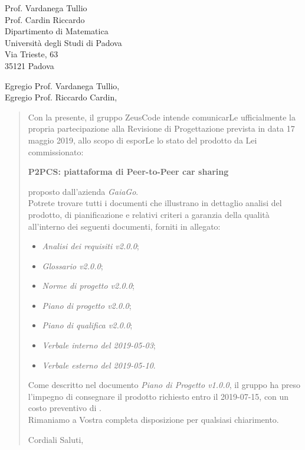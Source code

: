 \begin{letter}{
		Prof. Vardanega Tullio \\
		Prof. Cardin Riccardo \\
		Dipartimento di Matematica \\
		Università degli Studi di Padova \\
		Via Trieste, 63 \\
		35121 Padova}
		
\opening{Egregio Prof. Vardanega Tullio,\\Egregio Prof. Riccardo Cardin,}

\begin{quotation}
Con la presente, il gruppo ZeusCode intende comunicarLe ufficialmente la propria partecipazione alla Revisione di Progettazione prevista in data 17 maggio 2019, allo scopo di esporLe lo stato del prodotto
da Lei commissionato:

\begin{center}
	\textbf{P2PCS: piattaforma di Peer-to-Peer car sharing}
\end{center}

\noindent proposto dall'azienda \textit{GaiaGo}.\\
Potrete trovare tutti i documenti che illustrano in dettaglio analisi del prodotto, di pianificazione e relativi criteri a garanzia della qualità all'interno dei seguenti 
documenti, forniti in allegato:

\bigskip

\begin{itemize}
	\item \textit{Analisi dei requisiti v2.0.0};
	
	\item \textit{Glossario v2.0.0};
	
	\item \textit{Norme di progetto v2.0.0};

	\item \textit{Piano di progetto v2.0.0};

	\item \textit{Piano di qualifica v2.0.0};


	\item \textit{Verbale interno del 2019-05-03};
	\item \textit{Verbale esterno del 2019-05-10}.
\end{itemize}

\bigskip

\noindent Come descritto nel documento \textit{Piano di Progetto v1.0.0}, il gruppo ha preso l'impegno di consegnare il prodotto richiesto entro il 2019-07-15, con un costo preventivo di  \textbf{}.\\
Rimaniamo a Vostra completa disposizione per qualsiasi chiarimento.

\vspace{0.5cm}
\closing{ Cordiali Saluti,}
	

\end{quotation}
		
\end{letter}



